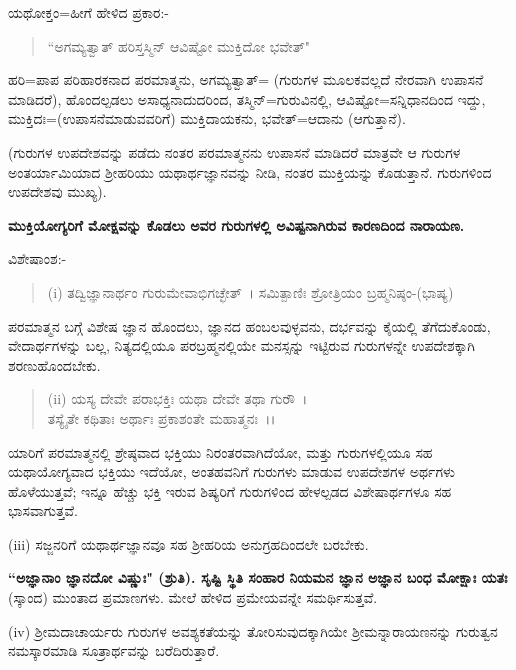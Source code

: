 ಯಥೋಕ್ತಂ=ಹೀಗೆ ಹೇಳಿದ ಪ್ರಕಾರ:-

\begin{verse}
``ಅಗಮ್ಯತ್ವಾತ್ ಹರಿಸ್ತಸ್ಮಿನ್ ಆವಿಷ್ಟೋ ಮುಕ್ತಿದೋ ಭವೇತ್"
\end{verse}

ಹರಿ=ಪಾಪ ಪರಿಹಾರಕನಾದ ಪರಮಾತ್ಮನು, ಅಗಮ್ಯತ್ವಾತ್= (ಗುರುಗಳ ಮೂಲಕವಲ್ಲದೆ ನೇರವಾಗಿ ಉಪಾಸನೆ ಮಾಡಿದರೆ), ಹೊಂದಲ್ಪಡಲು ಅಸಾಧ್ಯನಾದುದರಿಂದ, ತಸ್ಮಿನ್=ಗುರುವಿನಲ್ಲಿ, ಆವಿಷ್ಟೋ=ಸನ್ನಿಧಾನದಿಂದ ಇದ್ದು, ಮುಕ್ತಿದಃ=(ಉಪಾಸನೆಮಾಡುವವರಿಗೆ) ಮುಕ್ತಿದಾಯಕನು, ಭವೇತ್=ಆದಾನು (ಆಗುತ್ತಾನೆ).

(ಗುರುಗಳ ಉಪದೇಶವನ್ನು ಪಡೆದು ನಂತರ ಪರಮಾತ್ಮನನು ಉಪಾಸನೆ ಮಾಡಿದರೆ ಮಾತ್ರವೇ ಆ ಗುರುಗಳ ಅಂತರ್ಯಾಮಿಯಾದ ಶ‍್ರೀಹರಿಯು ಯಥಾರ್ಥಜ್ಞಾನವನ್ನು ನೀಡಿ, ನಂತರ ಮುಕ್ತಿಯನ್ನು ಕೊಡುತ್ತಾನೆ. ಗುರುಗಳಿಂದ ಉಪದೇಶವು ಮುಖ್ಯ).

\begin{center}
\textbf{ಮುಕ್ತಿಯೋಗ್ಯರಿಗೆ ಮೋಕ್ಷವನ್ನು ಕೊಡಲು ಅವರ ಗುರುಗಳಲ್ಲಿ ಅವಿಷ್ಟನಾಗಿರುವ ಕಾರಣದಿಂದ ನಾರಾಯಣ.}
\end{center}

\noindent
ವಿಶೇಷಾಂಶ:-

\begin{verse}
(i) ತದ್ವಿಜ್ಞಾನಾರ್ಥಂ ಗುರುಮೇವಾಭಿಗಚ್ಛೇತ್~। ಸಮಿತ್ಪಾಣಿಃ ಶ್ರೋತ್ರಿಯಂ ಬ್ರಹ್ಮನಿಷ್ಠಂ-(ಭಾಷ್ಯ)
\end{verse}

ಪರಮಾತ್ಮನ ಬಗ್ಗೆ ವಿಶೇಷ ಜ್ಞಾನ ಹೊಂದಲು, ಜ್ಞಾನದ ಹಂಬಲವುಳ್ಳವನು, ದರ್ಭವನ್ನು ಕೈಯಲ್ಲಿ ತೆಗೆದುಕೊಂಡು, ವೇದಾರ್ಥಗಳನ್ನು ಬಲ್ಲ, ನಿತ್ಯದಲ್ಲಿಯೂ ಪರಬ್ರಹ್ಮನಲ್ಲಿಯೇ ಮನಸ್ಸನ್ನು ಇಟ್ಟಿರುವ ಗುರುಗಳನ್ನೇ ಉಪದೇಶಕ್ಕಾಗಿ ಶರಣುಹೊಂದಬೇಕು.

\begin{verse}
(ii) ಯಸ್ಯ ದೇವೇ ಪರಾಭಕ್ತಿಃ ಯಥಾ ದೇವೇ ತಥಾ ಗುರೌ~।\\ ತಸ್ಯೈತೇ ಕಥಿತಾಃ ಅರ್ಥಾಃ ಪ್ರಕಾಶಂತೇ ಮಹಾತ್ಮನಃ~।।
\end{verse}


ಯಾರಿಗೆ ಪರಮಾತ್ಮನಲ್ಲಿ ಶ್ರೇಷ್ಠವಾದ ಭಕ್ತಿಯು ನಿರಂತರವಾಗಿದೆಯೋ, ಮತ್ತು ಗುರುಗಳಲ್ಲಿಯೂ ಸಹ ಯಥಾಯೋಗ್ಯವಾದ ಭಕ್ತಿಯು ಇದೆಯೋ, ಅಂತಹವನಿಗೆ ಗುರುಗಳು ಮಾಡುವ ಉಪದೇಶಗಳ ಅರ್ಥಗಳು ಹೊಳೆಯುತ್ತವೆ; ಇನ್ನೂ ಹೆಚ್ಚು ಭಕ್ತಿ ಇರುವ ಶಿಷ್ಯರಿಗೆ ಗುರುಗಳಿಂದ ಹೇಳಲ್ಪಡದ ವಿಶೇಷಾರ್ಥಗಳೂ ಸಹ ಭಾಸವಾಗುತ್ತವೆ.

(iii) ಸಜ್ಜನರಿಗೆ ಯಥಾರ್ಥಜ್ಞಾನವೂ ಸಹ ಶ‍್ರೀಹರಿಯ ಅನುಗ್ರಹದಿಂದಲೇ ಬರಬೇಕು.

\textbf{``ಅಜ್ಞಾನಾಂ ಜ್ಞಾನದೋ ವಿಷ್ಣುಃ" (ಶ್ರುತಿ). ಸೃಷ್ಟಿ ಸ್ಥಿತಿ ಸಂಹಾರ ನಿಯಮನ ಜ್ಞಾನ ಅಜ್ಞಾನ ಬಂಧ ಮೋಕ್ಷಾಃ ಯತಃ} (ಸ್ಕಾಂದ) ಮುಂತಾದ ಪ್ರಮಾಣಗಳು. ಮೇಲೆ ಹೇಳಿದ ಪ್ರಮೇಯವನ್ನೇ ಸಮರ್ಥಿಸುತ್ತವೆ.

(iv) ಶ‍್ರೀಮದಾಚಾರ್ಯರು ಗುರುಗಳ ಅವಶ್ಯಕತೆಯನ್ನು ತೋರಿಸುವುದಕ್ಕಾಗಿಯೇ ಶ‍್ರೀಮನ್ನಾರಾಯಣನನ್ನು ಗುರುತ್ವನ ನಮಸ್ಕಾರಮಾಡಿ ಸೂತ್ರಾರ್ಥವನ್ನು ಬರೆದಿರುತ್ತಾರೆ.

